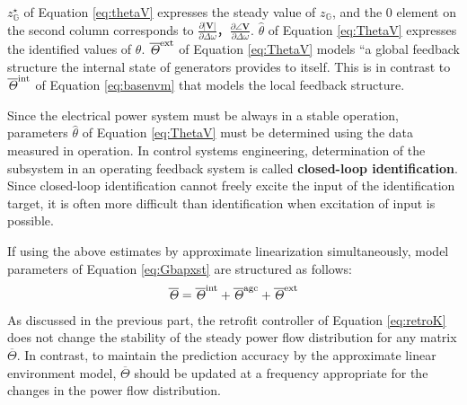 \documentclass[graybox, envcountchap]{svmult}
\begin{document}
$z_{\mathds G}^{\star}$ of Equation \ref{eq:thetaV} expresses the steady value of $z_{\mathds G}$, and the 0 element on the second column corresponds to $\tfrac{\partial |\bm{V}| }{\partial \Delta \omega}$，$\tfrac{\partial \angle \bm{V} }{\partial \Delta \omega}$.
$\hat{\theta}$ of Equation \ref{eq:ThetaV} expresses the identified values of $\theta$.
$\overline{\mathit{\Theta}}^{\rm ext}$ of Equation \ref{eq:ThetaV} models “a global feedback structure the internal state of generators provides to itself.
This is in contrast to $\overline{\mathit{\Theta}}^{\rm int}$ of Equation \ref{eq:basenvm} that models the local feedback structure.

Since the electrical power system must be always in a stable operation, parameters $\hat{\theta}$ of Equation \ref{eq:ThetaV} must be determined using the data measured in operation.
In control systems engineering, determination of the subsystem in an operating feedback system is called \textbf{closed-loop identification}.
Since closed-loop identification cannot freely excite the input of the identification target, it is often more difficult than identification when excitation of input is possible.

If using the above estimates by approximate linearization simultaneously, model parameters of Equation \ref{eq:Gbapxst} are structured as follows:
\begin{align}\label{eq:Thetasum}
\overline{\mathit{\Theta}}=
\overline{\mathit{\Theta}}^{\rm int}+
\overline{\mathit{\Theta}}^{\rm agc}+
\overline{\mathit{\Theta}}^{\rm ext}
\end{align}
As discussed in the previous part, the retrofit controller of Equation \ref{eq:retroK} does not change the stability of the steady power flow distribution for any matrix $\overline{\mathit{\Theta}}$.
In contrast, to maintain the prediction accuracy by the approximate linear environment model, $\overline{\mathit{\Theta}}$ should be updated at a frequency appropriate for the changes in the power flow distribution.
\end{document}
